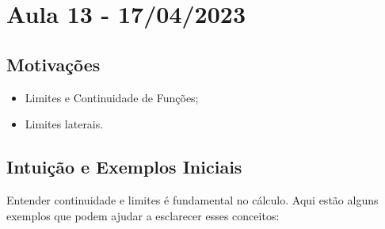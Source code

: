 \documentclass[analysis_notes.tex]{subfiles}
\begin{document}
\section{Aula 13 - 17/04/2023}
\subsection{Motiva\c c\~oes}
\begin{itemize}
	\item Limites e Continuidade de Fun\c c\~oes;
	\item Limites laterais.
\end{itemize}
\subsection{Intui\c c\~ao e Exemplos Iniciais}
Entender continuidade e limites é fundamental no cálculo. Aqui estão alguns exemplos que podem ajudar a esclarecer esses conceitos:
\end{document}
